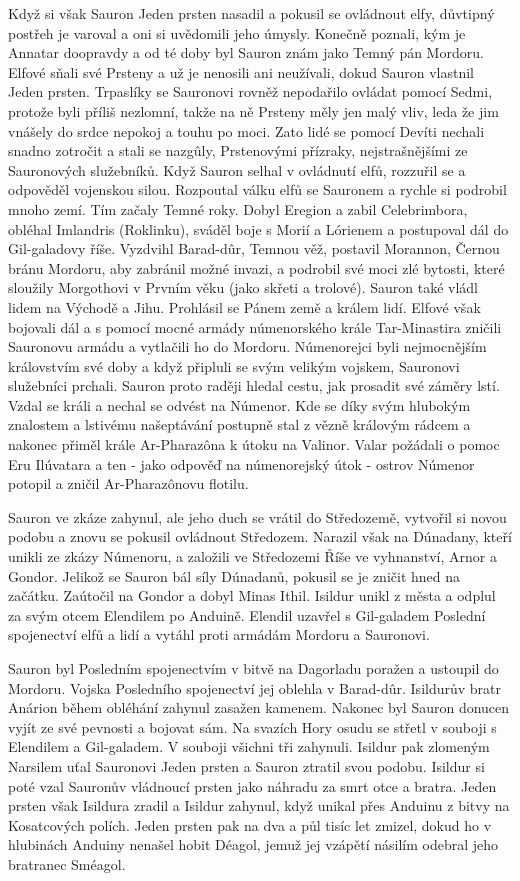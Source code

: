 \documentclass[12pt]{article}
\begin{document}
Když si však Sauron Jeden prsten nasadil a pokusil se ovládnout elfy, důvtipný postřeh je varoval a oni si uvědomili jeho úmysly. Konečně poznali, kým je Annatar doopravdy a od té doby byl Sauron znám jako Temný pán Mordoru. Elfové sňali své Prsteny a už je nenosili ani neužívali, dokud Sauron vlastnil Jeden prsten. Trpaslíky se Sauronovi rovněž nepodařilo ovládat pomocí Sedmi, protože byli příliš nezlomní, takže na ně Prsteny měly jen malý vliv, leda že jim vnášely do srdce nepokoj a touhu po moci. Zato lidé se pomocí Devíti nechali snadno zotročit a stali se nazgûly, Prstenovými přízraky, nejstrašnějšími ze Sauronových služebníků. Když Sauron selhal v ovládnutí elfů, rozzuřil se a odpověděl vojenskou silou. Rozpoutal válku elfů se Sauronem a rychle si podrobil mnoho zemí. Tím začaly Temné roky. Dobyl Eregion a zabil Celebrimbora, obléhal Imlandris (Roklinku), sváděl boje s Morií a Lórienem a postupoval dál do Gil-galadovy říše. Vyzdvihl Barad-dûr, Temnou věž, postavil Morannon, Černou bránu Mordoru, aby zabránil možné invazi, a podrobil své moci zlé bytosti, které sloužily Morgothovi v Prvním věku (jako skřeti a trolové). Sauron také vládl lidem na Východě a Jihu. Prohlásil se Pánem země a králem lidí. Elfové však bojovali dál a s pomocí mocné armády númenorského krále Tar-Minastira zničili Sauronovu armádu a vytlačili ho do Mordoru. Númenorejci byli nejmocnějším královstvím své doby a když připluli se svým velikým vojskem, Sauronovi služebníci prchali. Sauron proto raději hledal cestu, jak prosadit své záměry lstí. Vzdal se králi a nechal se odvést na Númenor. Kde se díky svým hlubokým znalostem a lstivému našeptávání postupně stal z vězně královým rádcem a nakonec přiměl krále Ar-Pharazôna k útoku na Valinor. Valar požádali o pomoc Eru Ilúvatara a ten - jako odpověď na númenorejský útok - ostrov Númenor potopil a zničil Ar-Pharazônovu flotilu.

Sauron ve zkáze zahynul, ale jeho duch se vrátil do Středozemě, vytvořil si novou podobu a znovu se pokusil ovládnout Středozem. Narazil však na Dúnadany, kteří unikli ze zkázy Númenoru, a založili ve Středozemi Říše ve vyhnanství, Arnor a Gondor. Jelikož se Sauron bál síly Dúnadanů, pokusil se je zničit hned na začátku. Zaútočil na Gondor a dobyl Minas Ithil. Isildur unikl z města a odplul za svým otcem Elendilem po Anduině. Elendil uzavřel s Gil-galadem Poslední spojenectví elfů a lidí a vytáhl proti armádám Mordoru a Sauronovi.

Sauron byl Posledním spojenectvím v bitvě na Dagorladu poražen a ustoupil do Mordoru. Vojska Posledního spojenectví jej oblehla v Barad-dûr. Isildurův bratr Anárion během obléhání zahynul zasažen kamenem. Nakonec byl Sauron donucen vyjít ze své pevnosti a bojovat sám. Na svazích Hory osudu se střetl v souboji s Elendilem a Gil-galadem. V souboji všichni tři zahynuli. Isildur pak zlomeným Narsilem uťal Sauronovi Jeden prsten a Sauron ztratil svou podobu. Isildur si poté vzal Sauronův vládnoucí prsten jako náhradu za smrt otce a bratra. Jeden prsten však Isildura zradil a Isildur zahynul, když unikal přes Anduinu z bitvy na Kosatcových polích. Jeden prsten pak na dva a půl tisíc let zmizel, dokud ho v hlubinách Anduiny nenašel hobit Déagol, jemuž jej vzápětí násilím odebral jeho bratranec Sméagol. 
\end{document}
